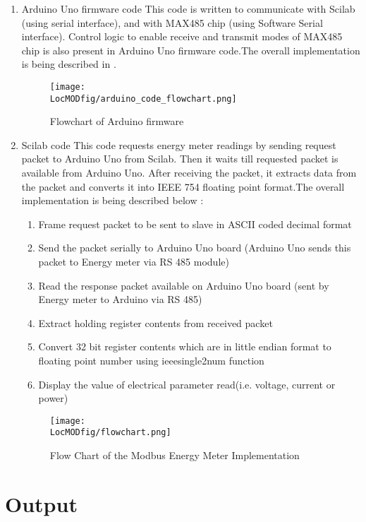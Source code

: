 \begin{enumerate}
\item Arduino Uno firmware code
This code is written to communicate with Scilab (using serial interface), and with MAX485 chip (using Software Serial interface). Control logic to enable receive and transmit modes of MAX485 chip is also present in Arduino Uno firmware code.The overall implementation is being described in .

\begin{figure}
\centering
\texttt{[image: \\LocMODfig/arduino\_code\_flowchart.png]}
\caption{Flowchart of Arduino firmware}
\label{fig:modbus-firmware}
\end{figure}

\item Scilab code
This code requests energy meter readings by sending request packet to Arduino Uno from Scilab. Then it waits till requested packet is available from Arduino Uno. After receiving the packet, it extracts data from the packet and converts it into IEEE 754 floating point format.The overall implementation is being described below :

\begin {enumerate}
\item Frame request packet to be sent to slave in ASCII coded decimal format
\item Send the packet serially to Arduino Uno board (Arduino Uno sends this packet to Energy meter via RS 485 module)
\item Read the response packet available on Arduino Uno board (sent by Energy meter to Arduino via RS 485)
\item Extract holding register contents from received packet
\item Convert  32 bit register contents which are in little endian format to floating point number using ieeesingle2num function
\item Display the value of electrical parameter read(i.e. voltage, current or power)
\end{enumerate}

\begin{figure}
\centering
\texttt{[image: \\LocMODfig/flowchart.png]}
\caption{Flow Chart of the Modbus Energy Meter Implementation}
\label{fig:flow-chart}
\end{figure}

\end{enumerate}

\section{Output}

